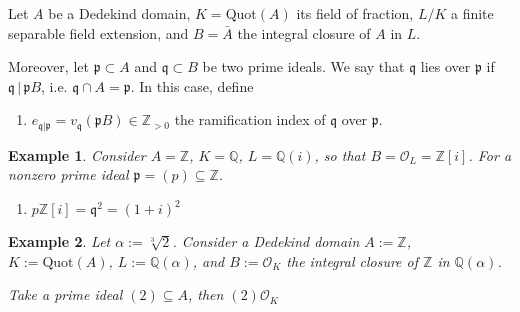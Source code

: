 \documentclass[a4paper]{book}
\theoremstyle{break}
\newtheorem{example}{Example}
\theoremstyle{plain}
\begin{document}
\begin{definition}
    Let \(A\) be a {\color{mathif}Dedekind domain}, \(K = \text{Quot}(A)\) its {\color{mathif}field of fraction}, \(L / K\) a {\color{mathif}finite separable field extension}, and \(B = \bar{A}\) the {\color{mathif}integral closure} of \(A\) in \(L\).
    
    Moreover, let \(\mathfrak{p} \subset A\) and \(\mathfrak{q} \subset B\) be two {\color{mathif}prime ideals}. We say that \(\mathfrak{q}\) {\color{mathrem}lies over} \(\mathfrak{p}\) if \(\mathfrak{q} \, | \, \mathfrak{p}B\), i.e. \(\mathfrak{q} \cap A = \mathfrak{p}\). In this case, define

    \begin{enumerate}
        \item \(e_{\mathfrak{q} | \mathfrak{p}} = v_\mathfrak{q}(\mathfrak{p}B) \in \mathbb{Z}_{>0}\) the {\color{maththen}ramification index} of \(\mathfrak{q}\) over \(\mathfrak{p}\).
    \end{enumerate}
\end{definition}

\begin{example}
    Consider \(A = \mathbb{Z}\), \(K = \mathbb{Q}\), \(L = \mathbb{Q}(i)\), so that \(B = \mathcal{O}_L = \mathbb{Z}[i]\). For a nonzero prime ideal \(\mathfrak{p} = (p) \subseteq \mathbb{Z}\).
    \begin{enumerate}
        \item \(p \mathbb{Z}[i] = \mathfrak{q}^2 = (1 + i)^2\)
    \end{enumerate}
\end{example}

\begin{example}
    Let \(\alpha := \sqrt[3]{2}\). Consider a Dedekind domain \(A := \mathbb{Z}\), \(K := \text{Quot}(A)\), \(L := \mathbb{Q}(\alpha)\), and \(B := \mathcal{O}_K\) the integral closure of \(\mathbb{Z}\) in \(\mathbb{Q}(\alpha)\).

    Take a prime ideal \((2) \subseteq A\), then \((2) \mathcal{O}_K\)
\end{example}
\end{document}
